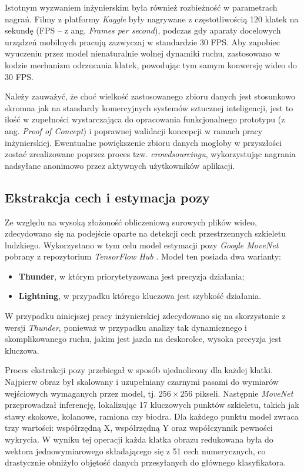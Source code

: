         Istotnym wyzwaniem inżynierskim była również rozbieżność w parametrach nagrań. Filmy z platformy \textit{Kaggle} były nagrywane z częstotliwością 120 klatek na sekundę (FPS – z ang. \textit{Frames per second}), podczas gdy aparaty docelowych urządzeń mobilnych pracują zazwyczaj w standardzie 30 FPS. Aby zapobiec wyuczeniu przez model nienaturalnie wolnej dynamiki ruchu, zastosowano w kodzie mechanizm odrzucania klatek, powodując tym samym konwersję wideo do 30 FPS.

        Należy zauważyć, że choć wielkość zastosowanego zbioru danych jest stosunkowo skromna jak na standardy komercyjnych systemów sztucznej inteligencji, jest to ilość w zupełności wystarczająca do opracowania funkcjonalnego prototypu (z ang. \textit{Proof of Concept}) i poprawnej walidacji koncepcji w ramach pracy inżynierskiej. Ewentualne powiększenie zbioru danych mogłoby w przyszłości zostać zrealizowane poprzez proces tzw. \textit{crowdsourcingu}, wykorzystując nagrania nadsyłane anonimowo przez aktywnych użytkowników aplikacji.

    \subsection{Ekstrakcja cech i estymacja pozy}

        Ze względu na wysoką złożoność obliczeniową surowych plików wideo, zdecydowano się na podejście oparte na detekcji cech przestrzennych szkieletu ludzkiego. Wykorzystano w tym celu model estymacji pozy \textit{Google MoveNet} pobrany z repozytorium \textit{TensorFlow Hub} \cite{openpose2025}. Model ten posiada dwa warianty:
        \begin{itemize}
            \item \textbf{Thunder}, w którym priorytetyzowana jest precyzja działania;
            \item \textbf{Lightning}, w przypadku którego kluczowa jest szybkość działania.
        \end{itemize}
        W przypadku niniejszej pracy inżynierskiej zdecydowano się na skorzystanie z wersji \textit{Thunder}, ponieważ w przypadku analizy tak dynamicznego i skomplikowanego ruchu, jakim jest jazda na deskorolce, wysoka precyzja jest kluczowa.

        Proces ekstrakcji pozy przebiegał w sposób ujednolicony dla każdej klatki. Najpierw obraz był skalowany i uzupełniany czarnymi pasami do wymiarów wejściowych wymaganych przez model, tj. $256\times256$ pikseli. Następnie \textit{MoveNet} przeprowadzał inferencję, lokalizując 17 kluczowych punktów szkieletu, takich jak stawy skokowe, kolanowe, ramiona czy biodra. Dla każdego punktu model zwraca trzy wartości: współrzędną X, współrzędną Y oraz współczynnik pewności wykrycia. W wyniku tej operacji każda klatka obrazu redukowana była do wektora jednowymiarowego składającego się z 51 cech numerycznych, co drastycznie obniżyło objętość danych przesyłanych do głównego klasyfikatora.

